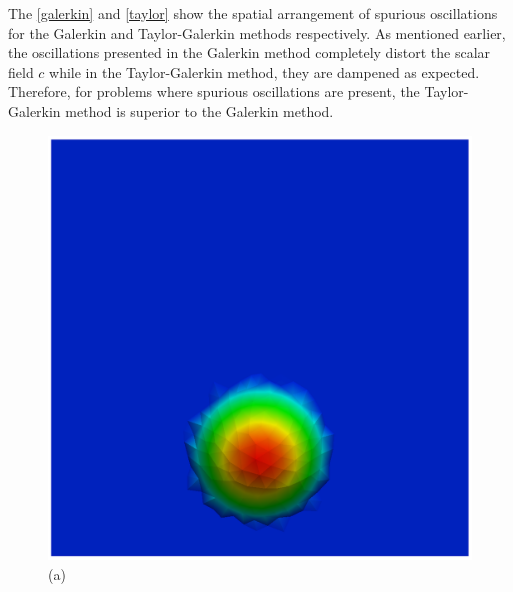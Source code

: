 \vspace{-1cm}
The \ref{galerkin} and \ref{taylor} show the spatial arrangement 
of spurious oscillations for the Galerkin and Taylor-Galerkin methods 
respectively. As mentioned earlier, the oscillations presented 
in the Galerkin method completely distort the scalar field $c$ 
while in the Taylor-Galerkin method, they are dampened as expected. 
Therefore, for problems where spurious oscillations are present, 
the Taylor-Galerkin method is superior to the Galerkin method.

\vspace{0.5cm}
\begin{figure}[H]
     \centering
     \begin{minipage}{.5\linewidth}
      \centering
      \includegraphics[scale=0.2]{./02_chaps/cap_validation/figure/galerkin_0.png}\\
      (a)
     \end{minipage}%
     \begin{minipage}{.5\linewidth}
      \centering

\end{minipage}
\end{figure}
